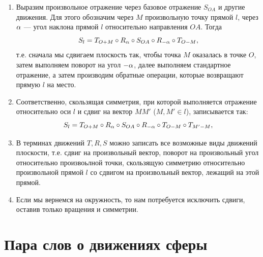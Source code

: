 \begin{enumerate}
\item Выразим произвольное отражение через базовое отражение $S_{OA}$ и другие движения. Для этого обозначим через $M$  произвольную точку прямой $l$, через $\alpha$ --- угол наклона прямой $l$ относительно направления $OA$. Тогда
$$
S_l = T_{O+M}\circ R_\alpha \circ S_{OA} \circ R_{-\alpha}\circ T_{O-M},
$$
т.е. сначала мы сдвигаем плоскость так, чтобы точка $M$ оказалась в точке $O$, затем выполняем поворот на угол $-\alpha$, далее выполняем стандартное отражение, а затем производим обратные операции, которые возвращают прямую $l$ на место.
\item Соответственно, скользящая симметрия, при которой выполняется отражение относительно оси $l$ и сдвиг на вектор $MM'$ ($M,M'\in l$), записывается так:
$$
S_l = T_{O+M}\circ R_\alpha \circ S_{OA} \circ R_{-\alpha}\circ T_{O-M}\circ T_{M'-M},
$$
\item В терминах движений $T,R,S$ можно записать все возможные виды движений плоскости, т.е. сдвиг на произвольный вектор, поворот на произвольный угол относительно произвоьлной точки, скользящую симметрию относительно произвольной прямой $l$ со сдвигом на произвольный вектор, лежащий на этой прямой.
\item Если мы вернемся на окружность, то нам потребуется исключить сдвиги, оставив только вращения и симметрии.
\end{enumerate}




\section{Пара слов о движениях сферы}

